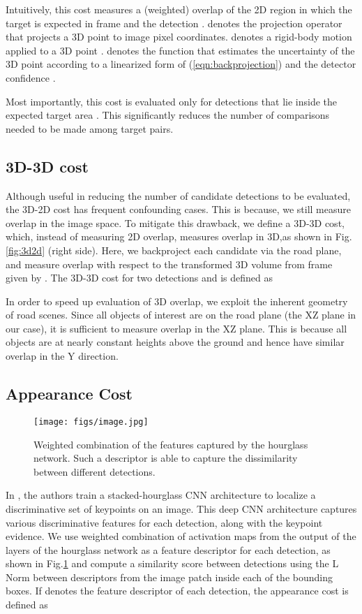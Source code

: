 \documentclass[letterpaper, 10 pt, conference]{ieeeconf}
\begin{document}
Intuitively, this cost measures a (weighted) overlap of the 2D region in which the target is expected in frame  and the detection .  denotes the projection operator that projects a 3D point to image pixel coordinates.  denotes a rigid-body motion  applied to a 3D point .  denotes the function that estimates the uncertainty of the 3D point  according to a linearized form of (\ref{eqn:backprojection}) and the detector confidence .

Most importantly, this cost is evaluated only for detections  that lie inside the expected target area . This significantly reduces the number of comparisons needed to be made among target pairs.

\subsection{3D-3D cost}

Although useful in reducing the number of candidate detections to be evaluated, the 3D-2D cost has frequent confounding cases. This is because, we still measure overlap in the image space. To mitigate this drawback, we define a 3D-3D cost, which, instead of measuring 2D overlap, measures overlap in 3D,as shown in Fig.\ref{fig:3d2d} (right side). Here, we backproject each candidate  via the road plane, and measure overlap with respect to the transformed 3D volume from frame  given by . The 3D-3D cost for two detections  and  is defined as


In order to speed up evaluation of 3D overlap, we exploit the inherent geometry of road scenes. Since all objects of interest are on the road plane (the XZ plane in our case), it is sufficient to measure overlap in the XZ plane. This is because all objects are at nearly constant heights above the ground and hence have similar overlap in the Y direction.

\subsection{Appearance Cost}
\begin{figure}
  \centering
  \texttt{[image: figs/image.jpg]}
  \caption{Weighted combination of the features captured by the hourglass network. Such a descriptor is able to capture the dissimilarity between different detections.}
  \label{fig:2d2d}
\end{figure}
In \cite{KM_IROS}, the authors train a stacked-hourglass CNN architecture to localize a discriminative set of keypoints on an image. This deep CNN architecture captures various discriminative features for each detection, along with the keypoint evidence. We use weighted combination of activation maps from the output of the layers of the hourglass network as a feature descriptor for each detection, as shown in Fig.\ref{fig:2d2d}  and compute a similarity score between detections using the L Norm between descriptors from the image patch inside each of the bounding boxes. If  denotes the feature descriptor of each detection, the appearance cost is defined as
\end{document}
